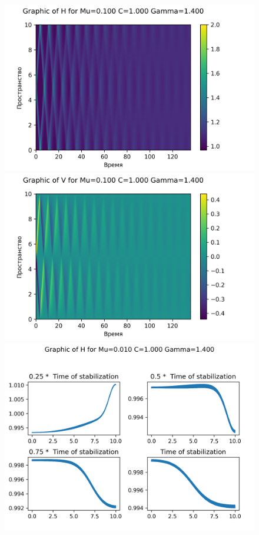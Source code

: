 \begin{figure}[H]
	\centering
	\includegraphics[scale=0.5]{../graphs_data_nonsmooth_2/value/Graph_H_mu0.010_C1.000_gamma1.400.png}
	\includegraphics[scale=0.5]{../graphs_data_nonsmooth_2/value/Graph_V_mu0.010_C1.000_gamma1.400.png}	
	\includegraphics[scale=0.5]{../graphs_data_nonsmooth_2/slices/Graph_H_mu0.010_C1.000_gamma1.400.png}

\end{figure}
